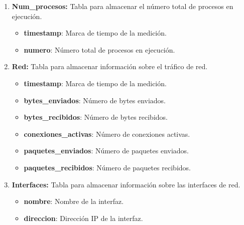 \documentclass{article}
\begin{document}
\begin{enumerate}
\begin{itemize}
        \item \textbf{memory\_percent}: Porcentaje de uso de la memoria RAM por el proceso.
        \item \textbf{vsz}: Tamaño virtual del proceso en memoria.
        \item \textbf{rss}: Tamaño real del proceso en RAM.
        \item \textbf{usuario}: Usuario que ejecuta el proceso.
        \item \textbf{nombre}: Nombre del proceso.
        \item \textbf{ruta}: Ruta del ejecutable del proceso.
        \item \textbf{hilos}: Número de hilos del proceso.
        \item \textbf{estado}: Estado del proceso (''ejecutándose", ''inactivo", "durmiendo", etc).
    \end{itemize}
    \item \textbf{Num\_procesos:} Tabla para almacenar el número total de procesos en ejecución.
    \begin{itemize}
        \item \textbf{timestamp}: Marca de tiempo de la medición.
        \item \textbf{numero}: Número total de procesos en ejecución.
    \end{itemize}
    \item \textbf{Red:} Tabla para almacenar información sobre el tráfico de red.
    \begin{itemize}
        \item \textbf{timestamp}: Marca de tiempo de la medición.
        \item \textbf{bytes\_enviados}: Número de bytes enviados.
        \item \textbf{bytes\_recibidos}: Número de bytes recibidos.
        \item \textbf{conexiones\_activas}: Número de conexiones activas.
        \item \textbf{paquetes\_enviados}: Número de paquetes enviados.
        \item \textbf{paquetes\_recibidos}: Número de paquetes recibidos.
    \end{itemize}
    \item \textbf{Interfaces:} Tabla para almacenar información sobre las interfaces de red.
    \begin{itemize}
        \item \textbf{nombre}: Nombre de la interfaz.
        \item \textbf{direccion}: Dirección IP de la interfaz.

\end{itemize}
\end{enumerate}
\end{document}
